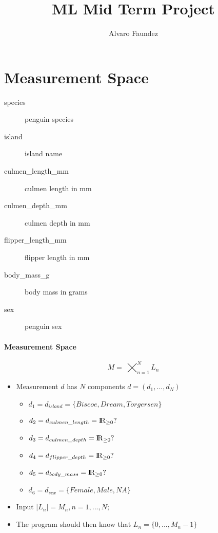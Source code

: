 \documentclass[12pt]{article}
\begin{document}
\title{ML Mid Term Project}
\author{Alvaro Faundez}
\maketitle

\section*{Measurement Space}

\begin{description}
	\item[species] penguin species
	\item[island] island name
	\item[culmen\_length\_mm] culmen length in mm
	\item[culmen\_depth\_mm] culmen depth in mm
	\item[flipper\_length\_mm] flipper length in mm
	\item[body\_mass\_g] body mass in grams
	\item[sex] penguin sex
\end{description}

\paragraph{Measurement Space}

\begin{equation}
M = 􏰡\bigtimes_{n=1}^N L_{n}
\end{equation}


\begin{itemize}
	\item Measurement $d$ has $N$ components $d = (d_1,...,d_N)$
		\begin{itemize}
			\item $d_1 = d_{island} = \{Biscoe, Dream, Torgersen\}$
			\item $d_2 =  d_{culmen\_length} = {\rm I\!R}_{\geq 0}?$
			\item $d_3 = d_{culmen\_depth} = {\rm I\!R}_{\geq 0}?$
			\item $d_4 = d_{flipper\_depth} = {\rm I\!R}_{\geq 0}?$
			\item $d_5 = d_{body\_mass} = {\rm I\!R}_{\geq 0}?$
			\item $d_6 = d_{sex} = \{Female, Male, N\!A\}$
		\end{itemize}
	\item Input $|L_n| = M_n, n = 1,...,N;$
	\item The program should then know that $L_n = \{0,...,M_{n}-1\}$
\end{itemize}
\end{document}
